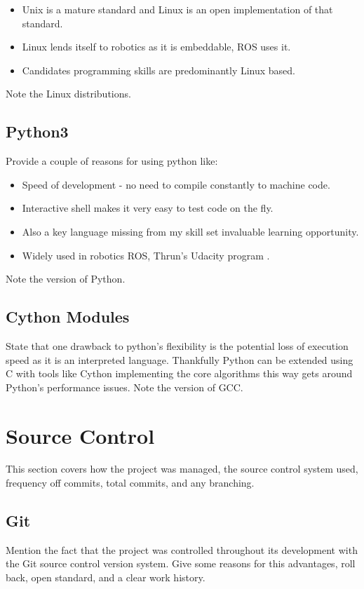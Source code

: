 \begin{itemize}
\item Unix is a mature standard and Linux is an open implementation of that standard.
\item Linux lends itself to robotics as it is embeddable, ROS uses it.
\item Candidates programming skills are predominantly Linux based.
\end{itemize} 

Note the Linux distributions.

\subsection{Python3}
Provide a couple of reasons for using python like:

\begin{itemize}
\item Speed of development - no need to compile constantly to machine code.
\item Interactive shell makes it very easy to test code on the fly.
\item Also a key language missing from my skill set invaluable learning opportunity.
\item Widely used in robotics ROS, Thrun's Udacity program .
\end{itemize} 

Note the version of Python.

\subsection{Cython Modules}
State that one drawback to python's flexibility is the potential loss of execution speed as it is an interpreted language. Thankfully Python can be extended using C with tools like Cython implementing the core algorithms this way gets around Python's performance issues. Note the version of GCC.

\newpage


\section{Source Control}
This section covers how the project was managed, the source control system used, frequency off commits, total commits, and any branching.

\subsection{Git}
Mention the fact that the project was controlled throughout its development with the Git source control version system. Give some reasons for this advantages, roll back, open standard, and a clear work history.

